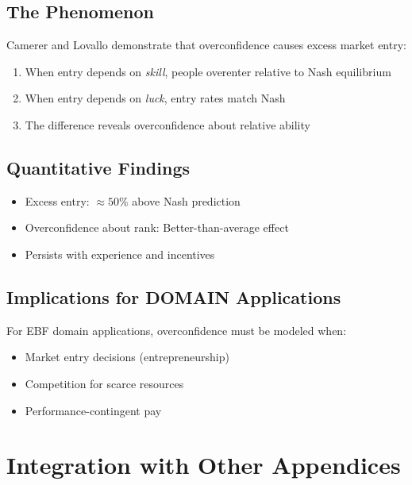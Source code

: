 \subsection{The Phenomenon}

Camerer and Lovallo \citep{PAP-camerer1999overconfidence} demonstrate that overconfidence causes excess market entry:

\begin{enumerate}[nosep]
\item When entry depends on \textit{skill}, people overenter relative to Nash equilibrium
\item When entry depends on \textit{luck}, entry rates match Nash
\item The difference reveals overconfidence about relative ability
\end{enumerate}

\subsection{Quantitative Findings}

\begin{itemize}[nosep]
\item Excess entry: $\approx 50\%$ above Nash prediction
\item Overconfidence about rank: Better-than-average effect
\item Persists with experience and incentives
\end{itemize}

\subsection{Implications for DOMAIN Applications}

For EBF domain applications, overconfidence must be modeled when:
\begin{itemize}[nosep]
\item Market entry decisions (entrepreneurship)
\item Competition for scarce resources
\item Performance-contingent pay
\end{itemize}


\section{Integration with Other Appendices}
\label{sec:ca-integration}


